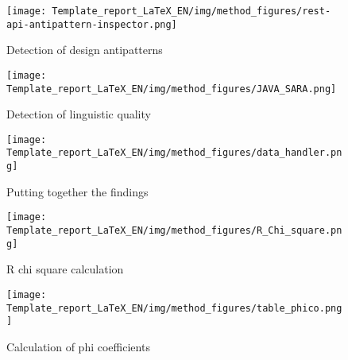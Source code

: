 \documentclass[a4paper,12pt]{article}
\begin{document}
\begin{figure}[htb!]
    \centering
    \texttt{[image: Template\_report\_LaTeX\_EN/img/method\_figures/rest-api-antipattern-inspector.png]}
    \caption{Detection of design antipatterns}
    \label{fig:Detection of design antipatterns}
\end{figure}

\begin{figure}[htb!]
    \centering
    \texttt{[image: Template\_report\_LaTeX\_EN/img/method\_figures/JAVA\_SARA.png]}
    \caption{Detection of linguistic quality}
    \label{fig:Detection of linguistic quality}
\end{figure}

\begin{figure}
    \centering
    \texttt{[image: Template\_report\_LaTeX\_EN/img/method\_figures/data\_handler.png]}
    \caption{Putting together the findings}
    \label{fig:Putting together the findings}
\end{figure}

\begin{figure}
    \centering
    \texttt{[image: Template\_report\_LaTeX\_EN/img/method\_figures/R\_Chi\_square.png]}
    \caption{R chi square calculation}
    \label{fig:R chi square calculation}
\end{figure}

\begin{figure}
    \centering
    \texttt{[image: Template\_report\_LaTeX\_EN/img/method\_figures/table\_phico.png]}
    \caption{Calculation of phi coefficients}
    \label{fig:Calculation of phi coefficients}
\end{figure}

\clearpage
\end{document}
